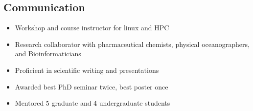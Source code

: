 \begin{multicols}{2}

\subsection{Communication}
\begin{itemize}
\item{Workshop and course instructor for linux and HPC}
\item{Research collaborator with pharmaceutical chemists, physical oceanographers, and Bioinformaticians}
\item{Proficient in scientific writing and presentations}
\item{Awarded best PhD seminar twice, best poster once}
\item{Mentored 5 graduate and 4 undergraduate students}
\end{itemize}

\end{multicols}




